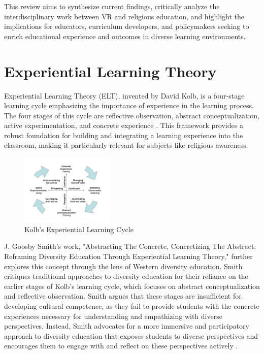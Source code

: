 \documentclass[conference]{IEEEtran}
\begin{document}
This review aims to synthesize current findings, critically analyze the interdisciplinary work between VR and religious education, and highlight the implications for educators, curriculum developers, and policymakers seeking to enrich educational experience and outcomes in diverse learning environments.

\section{Experiential Learning Theory}
Experiential Learning Theory (ELT), invented by David Kolb, is a four-stage learning cycle emphasizing the importance of experience in the learning process. The four stages of this cycle are reflective observation, abstract conceptualization, active experimentation, and concrete experience \cite{kolb_experiential_1984}. This framework provides a robust foundation for building and integrating a learning experience into the classroom, making it particularly relevant for subjects like religious awareness.  

\begin{figure}[h]
    \centering
    \includegraphics[width=0.4\textwidth]{kolb_diagram}
    \caption{Kolb's Experiential Learning Cycle}
    \label{fig:kolb_diagram}
\end{figure}

J. Goosby Smith's work, "Abstracting The Concrete, Concretizing The Abstract: Reframing Diversity Education Through Experiential Learning Theory," further explores this concept through the lens of Western diversity education. Smith critiques traditional approaches to diversity education for their reliance on the earlier stages of Kolb's learning cycle, which focuses on abstract conceptualization and reflective observation. Smith argues that these stages are insufficient for developing cultural competence, as they fail to provide students with the concrete experiences necessary for understanding and empathizing with diverse perspectives. Instead, Smith advocates for a more immersive and participatory approach to diversity education that exposes students to diverse perspectives and encourages them to engage with and reflect on these perspectives actively \cite{smith_abstracting_2011}. 
\end{document}
